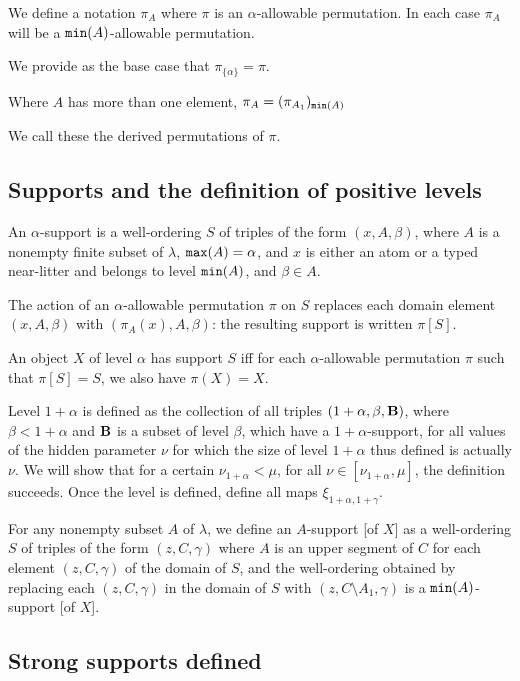 \documentclass[12pt]{article}
\begin{document}
We define a notation $\pi_A$ where $\pi$ is an $\alpha$-allowable permutation.  In each case $\pi_A$ will be a ${\tt min}(A)$-allowable permutation.

We provide as the base case that $\pi_{\{\alpha\}} = \pi$.

Where $A$ has more than one element, $\pi_A = (\pi_{A_1})_{{\tt min}(A)}$

We call these the derived permutations of $\pi$.

\subsection{Supports and the definition of positive levels}

An $\alpha$-support is a well-ordering $S$ of triples of the form $(x,A,\beta)$, where $A$ is a nonempty finite subset of $\lambda$,  ${\tt max}(A)=\alpha$, and $x$ is either an atom or a typed near-litter and belongs to level ${\tt min}(A)$, and $\beta\in A$.

The action of an $\alpha$-allowable permutation $\pi$ on $S$ replaces each domain element  $(x,A,\beta)$ with $(\pi_A(x),A,\beta)$:  the resulting support is written $\pi[S]$.

An object $X$ of level $\alpha$ has support $S$ iff for each $\alpha$-allowable permutation $\pi$ such that $\pi[S]=S$, we also have $\pi(X)=X$.

Level $1+\alpha$ is defined as the collection of all triples $(1+\alpha,\beta,{\bf B})$, where $\beta<1+\alpha$ and ${\bf B}$ is a subset of level $\beta$, which have a $1+\alpha$-support, for all values of the hidden
parameter $\nu$ for which the size of level $1+\alpha$ thus defined is actually $\nu$.  We will show that for a certain $\nu_{1+\alpha}<\mu$, for all $\nu \in [\nu_{1+\alpha},\mu]$, the definition succeeds.  Once the level is defined, define all maps $\xi_{1+\alpha,1+\gamma}$.

For any nonempty subset $A$ of $\lambda$, we define an $A$-support [of $X$] as a well-ordering $S$ of triples of the form $(z,C,\gamma)$  where $A$ is an upper segment of $C$ for each element $(z,C,\gamma)$ of the domain of $S$, and the
well-ordering obtained by replacing each $(z,C,\gamma)$ in the domain of $S$ with $(z,C \setminus A_1,\gamma)$ is
a ${\tt min}(A)$-support [of $X$].

\subsection{Strong supports defined}
\end{document}
